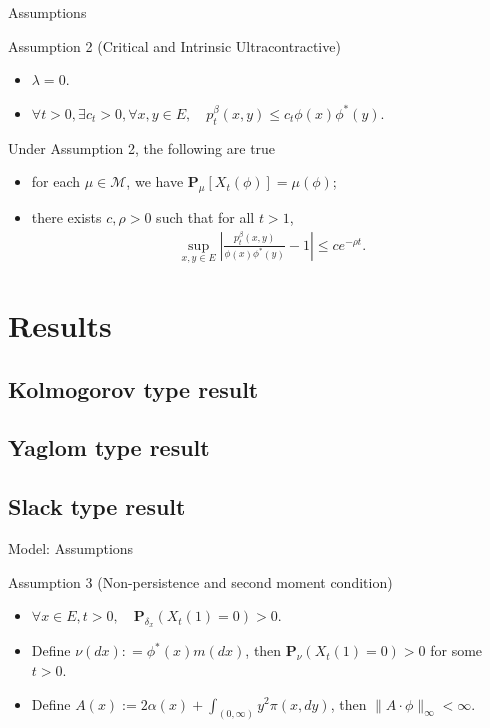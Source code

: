 \documentclass[xcolor=dvipsnames]{beamer}
\begin{document}
\begin{frame}{Assumptions}

\begin{block}{Assumption 2 (Critical and Intrinsic Ultracontractive)}
  \begin{itemize}
  \item 
    $\lambda = 0$.
  \item
    $\forall t > 0, \exists c_t>0, \forall x,y \in E, \quad p_t^\beta (x,y) \leq c_t \phi(x) \phi^*(y)$.
  \end{itemize}
\end{block}
Under Assumption 2, the following are true
\begin{itemize}
\item for each $\mu \in \mathcal M$, we have $\mathbf P_\mu [X_t(\phi)] = \mu(\phi)$;
\item there exists $c,\rho > 0$ such that for all $t > 1$,
  \begin{align}
    \sup_{x,y \in E} \left| \frac{p^\beta_t(x,y)}{ \phi(x) \phi^*(y)} - 1 \right| 
\leq ce^{-\rho t}.
  \end{align}
\end{itemize}
\end{frame}

\section{Results}
\subsection{Kolmogorov type result}
\subsection{Yaglom type result}
\subsection{Slack type result}

\begin{frame}{Model: Assumptions}
  \begin{block}{Assumption 3 (Non-persistence and second moment condition)}
    \begin{itemize}
    \item 
      $\forall x \in E, t > 0, \quad \mathbf P_{\delta_x} ( X_t(1) = 0) > 0$.
    \item
      Define 	$\nu(dx) : = \phi^* (x) m(dx)$, then $\mathbf P_\nu(X_t(1) = 0) > 0$ for some $t>0$.
    \item
      Define $A(x):= 2\alpha(x) + \int_{(0,\infty)} y^2\pi(x,dy)$, then $\|A\cdot \phi\|_\infty < \infty$.
    \end{itemize}
  \end{block}
\end{frame}
\end{document}

